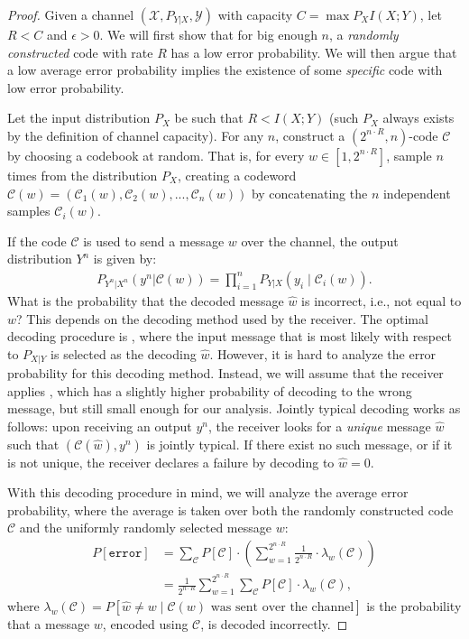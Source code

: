 \begin{proof}
\newcommand{\cran}{\ensuremath{\mathcal{C}}\xspace}
\newcommand{\xran}{\ensuremath{\mathcal{C}}\xspace}
\newcommand{\cspec}{\ensuremath{\mathcal{C}^*}\xspace}
\newcommand{\error}{\texttt{error}}
Given a channel $(\mathcal{X},P_{Y|X},\mathcal{Y})$ with capacity $C = \max{P_X} I(X;Y)$, let $R < C$ and $\epsilon > 0$. We will first show that for big enough $n$, a \emph{randomly constructed} code with rate $R$ has a low error probability. We will then argue that a low average error probability implies the existence of some \emph{specific} code with low error probability.

Let the input distribution $P_X$ be such that $R < I(X;Y)$ (such $P_X$ always exists by the definition of channel capacity). For any $n$, construct a $(2^{n \cdot R},n)$-code \cran by choosing a codebook at random. That is, for every $w \in [1,2^{n \cdot R}]$, sample $n$ times from the distribution $P_X$, creating a codeword $\cran(w) = (\xran_1(w), \xran_2(w), ..., \xran_n(w))$ by concatenating the $n$ independent samples $\xran_i(w)$.

If the code \cran is used to send a message $w$ over the channel, the output distribution $Y^n$ is given by:
\begin{align}
P_{Y^n|X^n}(y^n|\cran(w)) = \prod_{i=1}^n P_{Y|X} (y_i \mid \xran_i(w)).
\end{align}
What is the probability that the decoded message $\hat{w}$ is incorrect, i.e., not equal to $w$? This depends on the decoding method used by the receiver. The optimal decoding procedure is , where the input message that is most likely with respect to $P_{X|Y}$ is selected as the decoding $\hat{w}$. However, it is hard to analyze the error probability for this decoding method. Instead, we will assume that the receiver applies , which has a slightly higher probability of decoding to the wrong message, but still small enough for our analysis. Jointly typical decoding works as follows: upon receiving an output $y^n$, the receiver looks for a \emph{unique} message $\hat{w}$ such that $(\cran(\hat{w}),y^n)$ is jointly typical. If there exist no such message, or if it is not unique, the receiver declares a failure by decoding to $\hat{w} = 0$.

With this decoding procedure in mind, we will analyze the average error probability, where the average is taken over both the randomly constructed code \cran and the uniformly randomly selected message $w$:
\begin{align}
P[\error] &= \sum_{\cran} P[\cran] \cdot \left(\sum_{w=1}^{2^{n\cdot R}} \frac{1}{2^{n \cdot R}} \cdot \lambda_w(\cran) \right)\nonumber\\
&= \frac{1}{2^{n \cdot R}} \sum_{w = 1}^{2^{n \cdot R}} \sum_{\cran} P[\cran] \cdot \lambda_w(\cran),\label{eq:prob-error}
\end{align}
where $\lambda_w(\cran) = P[\hat{w} \neq w \mid \cran(w) \text{ was sent over the channel}]$ is the probability that a message $w$, encoded using $\cran$, is decoded incorrectly.


\end{proof}
